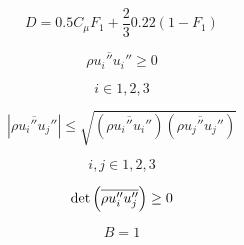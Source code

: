 \begin{equation}
D = 0.5 C_{\mu} F_1 + \frac{2}{3} 0.22 (1-F_1)
\end{equation}

\begin{equation}
\overline {\rho u_i'' u_i''} \geq 0
\end{equation}

\begin{equation}
i \in {1,2,3}
\end{equation}

\begin{equation}
\left|\overline {\rho u_i'' u_j''}\right| \leq 
\sqrt{\left(\overline {\rho u_i'' u_i''}\right) \left(\overline {\rho u_j'' u_j''}\right)}
\end{equation}

\begin{equation}
i,j \in {1,2,3}
\end{equation}

\begin{equation}
{\rm det}\left(\overline {\rho u_i'' u_j''}\right) \geq 0
\end{equation}

\begin{equation}
B=1
\end{equation}


